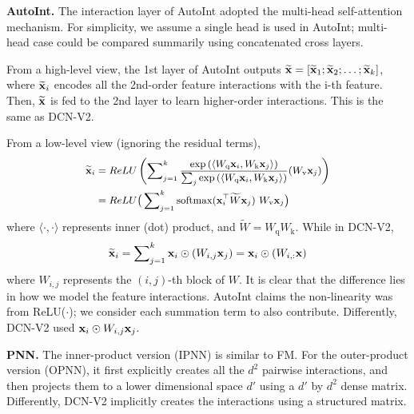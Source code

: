 \documentclass[sigconf]{acmart}
\newcommand{\vecx}{{\bf x}}
\begin{document}
{\bf AutoInt.} The interaction layer of AutoInt adopted the multi-head self-attention mechanism. For simplicity, we assume a single head is used in AutoInt; multi-head case could be compared summarily using concatenated cross layers.  

From a high-level view, the 1st layer of AutoInt outputs $\widetilde \vecx = [\widetilde \vecx_1; \widetilde \vecx_2; \ldots; \widetilde \vecx_k]$, where $\widetilde \vecx_i$ encodes all the 2nd-order feature interactions with the i-th feature. Then, $\widetilde \vecx$ is fed to the 2nd layer to learn higher-order interactions. This is the same as {DCN-V2}. 

From a low-level view (ignoring the residual terms),
\begin{equation*}
\small
    \label{eq:autoint}
    \begin{split}
        \widetilde \vecx_i
        &= ReLU\left(\sum\nolimits_{j=1}^k \frac{\exp \left(\langle W_{\text{q}} \vecx_i, W_{\text{k}} \vecx_j \rangle \right)}{\sum\nolimits_j \exp \left(\langle W_{\text{q}} \vecx_i, W_{\text{k}} \vecx_j \rangle \right)} (W_{\text{v}} \vecx_j)\right) \\
        &= ReLU\big(\sum\nolimits_{j=1}^k \text{softmax}( \vecx_i^\top \widetilde W \vecx_j)~ W_{\text{v}} \vecx_j \big)
\end{split}
\end{equation*}
where $\langle \cdot, \cdot \rangle$ represents inner (dot) product, and $\widetilde W = W_{\text{q}} W_{\text{k}}$.
While in {DCN-V2}, 
\begin{equation}
    \label{eq:autoint_dcn}
    \begin{split}
        \widetilde \vecx_i = \sum\nolimits_{j=1}^k \vecx_i \odot (W_{i,j} \vecx_j) = \vecx_i \odot (W_{i,:} \vecx)
    \end{split}
\end{equation}
where $W_{i,j}$ represents the $(i,j)$-th block of $W$. It is clear that the difference lies in how we model the feature interactions. AutoInt claims the non-linearity was from ReLU($\cdot$); we consider each summation term to also contribute. Differently, {DCN-V2} used $\vecx_i \odot W_{i,j} \vecx_j$. 

{\bf PNN.} The inner-product version (IPNN) is similar to FM. For the outer-product version (OPNN), it first explicitly creates all the $d^2$ pairwise interactions,
and then projects them to a lower dimensional space $d'$ using a $d'$ by $d^2$ dense matrix. Differently, {DCN-V2} implicitly creates the interactions using a structured matrix.
\end{document}
